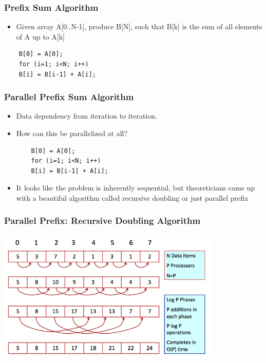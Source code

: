 \documentclass{beamer}
\begin{document}


\begin{frame}[fragile]
  \frametitle{Prefix Sum Algorithm}
  \begin{itemize}
  \item Given array A[0..N-1], produce B[N], such that B[k] is the sum of all
  elements of A up to A[k]
  \end{itemize}
    \begin{lstlisting}
    B[0] = A[0];
    for (i=1; i<N; i++) 
    B[i] = B[i-1] + A[i];
    \end{lstlisting}
\end{frame}

\begin{frame}[fragile]
  \frametitle{Parallel Prefix Sum Algorithm}
  \begin{itemize}
  \item Data dependency from iteration to iteration.
  \item How can this be parallelized at all?
    \begin{lstlisting}
    B[0] = A[0];
    for (i=1; i<N; i++) 
    B[i] = B[i-1] + A[i];
    \end{lstlisting}
    \item It looks like the problem is inherently sequential, but theoreticians
    came up with a beautiful algorithm called recursive doubling or just
    parallel prefix
  \end{itemize}
\end{frame}

\begin{frame}[fragile]
  \frametitle{Parallel Prefix: Recursive Doubling Algorithm}
  \begin{center}
  \includegraphics[width=0.8\textwidth]{figures/par_prefix_sum.png} 
  \end{center}
\end{frame}
\end{document}
